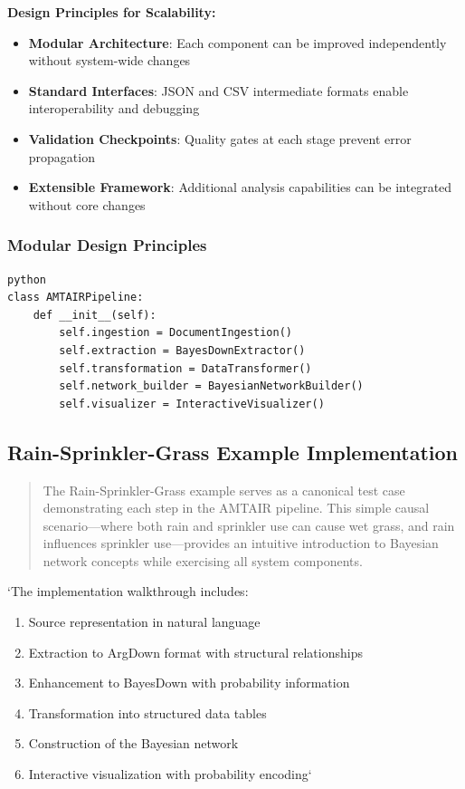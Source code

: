 \documentclass[
  11pt,
  letterpaper,
]{book}
\providecommand{\tightlist}{%
  \setlength{\itemsep}{0pt}\setlength{\parskip}{0pt}}
\begin{document}
\textbf{Design Principles for Scalability:}

\begin{itemize}
\tightlist
\item
  \textbf{Modular Architecture}: Each component can be improved
  independently without system-wide changes
\item
  \textbf{Standard Interfaces}: JSON and CSV intermediate formats enable
  interoperability and debugging
\item
  \textbf{Validation Checkpoints}: Quality gates at each stage prevent
  error propagation
\item
  \textbf{Extensible Framework}: Additional analysis capabilities can be
  integrated without core changes
\end{itemize}

\subsubsection{Modular Design Principles}\label{sec-modular-design}

\begin{verbatim}
python
class AMTAIRPipeline:
    def __init__(self):
        self.ingestion = DocumentIngestion()
        self.extraction = BayesDownExtractor() 
        self.transformation = DataTransformer()
        self.network_builder = BayesianNetworkBuilder()
        self.visualizer = InteractiveVisualizer()
\end{verbatim}

\subsection{Rain-Sprinkler-Grass Example
Implementation}\label{sec-rain-sprinkler-grass}

\begin{quote}
The Rain-Sprinkler-Grass example serves as a canonical test case
demonstrating each step in the AMTAIR pipeline. This simple causal
scenario---where both rain and sprinkler use can cause wet grass, and
rain influences sprinkler use---provides an intuitive introduction to
Bayesian network concepts while exercising all system components.
\end{quote}

`The implementation walkthrough includes:

\begin{enumerate}
\def\labelenumi{\arabic{enumi}.}
\tightlist
\item
  Source representation in natural language
\item
  Extraction to ArgDown format with structural relationships
\item
  Enhancement to BayesDown with probability information
\item
  Transformation into structured data tables
\item
  Construction of the Bayesian network
\item
  Interactive visualization with probability encoding`
\end{enumerate}
\end{document}
